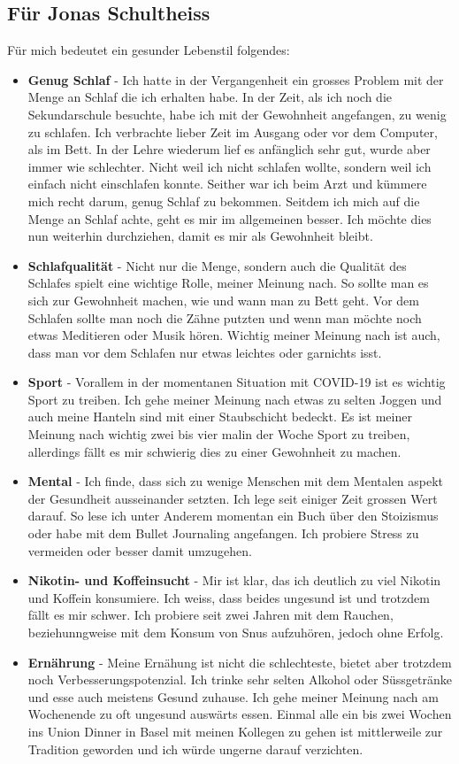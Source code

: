 \subsection{Für Jonas Schultheiss}
Für mich bedeutet ein gesunder Lebenstil folgendes:
\begin{itemize}
  \item \textbf{Genug Schlaf} - Ich hatte in der Vergangenheit ein grosses Problem mit der Menge an Schlaf die ich erhalten habe. In der Zeit, als ich noch die Sekundarschule besuchte, habe ich mit der Gewohnheit angefangen, zu wenig zu schlafen. Ich verbrachte lieber Zeit im Ausgang oder vor dem Computer, als im Bett. In der Lehre wiederum lief es anfänglich sehr gut, wurde aber immer wie schlechter. Nicht weil ich nicht schlafen wollte, sondern weil ich einfach nicht einschlafen konnte. Seither war ich beim Arzt und kümmere mich recht darum, genug Schlaf zu bekommen.
  \newline
  Seitdem ich mich auf die Menge an Schlaf achte, geht es mir im allgemeinen besser. Ich möchte dies nun weiterhin durchziehen, damit es mir als Gewohnheit bleibt.
  \item \textbf{Schlafqualität} - Nicht nur die Menge, sondern auch die Qualität des Schlafes spielt eine wichtige Rolle, meiner Meinung nach. So sollte man es sich zur Gewohnheit machen, wie und wann man zu Bett geht. Vor dem Schlafen sollte man noch die Zähne putzten und wenn man möchte noch etwas Meditieren oder Musik hören. Wichtig meiner Meinung nach ist auch, dass man vor dem Schlafen nur etwas leichtes oder garnichts isst.
  \item \textbf{Sport} - Vorallem in der momentanen Situation mit COVID-19 ist es wichtig Sport zu treiben. Ich gehe meiner Meinung nach etwas zu selten Joggen und auch meine Hanteln sind mit einer Staubschicht bedeckt. Es ist meiner Meinung nach wichtig zwei bis vier malin der Woche Sport zu treiben, allerdings fällt es mir schwierig dies zu einer Gewohnheit zu machen.
  \item \textbf{Mental} - Ich finde, dass sich zu wenige Menschen mit dem Mentalen aspekt der Gesundheit ausseinander setzten. Ich lege seit einiger Zeit grossen Wert darauf. So lese ich unter Anderem momentan ein Buch über den Stoizismus oder habe mit dem Bullet Journaling angefangen. Ich probiere Stress zu vermeiden oder besser damit umzugehen.
  \item \textbf{Nikotin- und Koffeinsucht} - Mir ist klar, das ich deutlich zu viel Nikotin und Koffein konsumiere. Ich weiss, dass beides ungesund ist und trotzdem fällt es mir schwer. Ich probiere seit zwei Jahren mit dem Rauchen, beziehunngweise mit dem Konsum von Snus aufzuhören, jedoch ohne Erfolg.
  \item \textbf{Ernährung} - Meine Ernähung ist nicht die schlechteste, bietet aber trotzdem noch Verbesserungspotenzial. Ich trinke sehr selten Alkohol oder Süssgetränke und esse auch meistens Gesund zuhause. Ich gehe meiner Meinung nach am Wochenende zu oft ungesund auswärts essen. Einmal alle ein bis zwei Wochen ins Union Dinner in Basel mit meinen Kollegen zu gehen ist mittlerweile zur Tradition geworden und ich würde ungerne darauf verzichten.
\end{itemize}